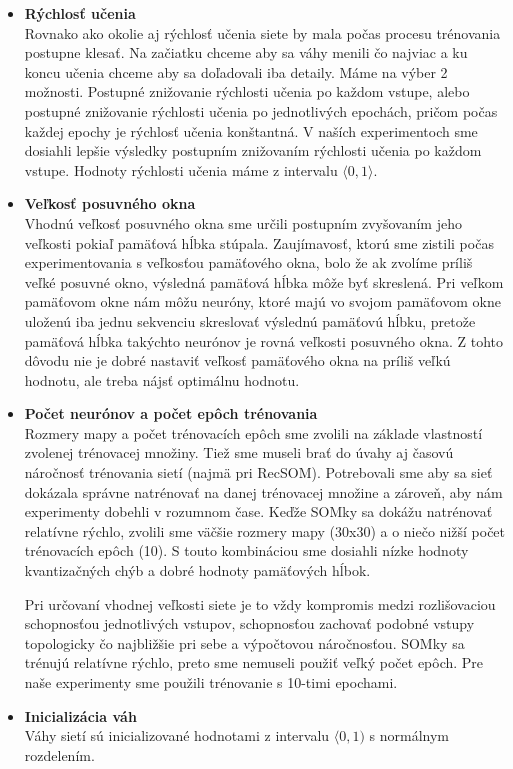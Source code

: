 \begin{itemize}
    \item \textbf{Rýchlosť učenia} \\
    Rovnako ako okolie aj rýchlosť učenia siete by mala počas
procesu trénovania postupne klesať. Na začiatku chceme aby sa váhy menili čo najviac
a ku koncu učenia chceme aby sa doľadovali iba detaily.
Máme na výber 2 možnosti. Postupné znižovanie rýchlosti učenia po každom vstupe, alebo 
postupné znižovanie rýchlosti učenia po jednotlivých epochách, pričom počas každej epochy
je rýchlosť učenia konštantná. 
V naších experimentoch sme dosiahli lepšie výsledky postupním 
znižovaním rýchlosti učenia po každom vstupe. 
Hodnoty rýchlosti učenia máme z intervalu $\langle0, 1\rangle$.
    \item \textbf{Veľkosť posuvného okna} \\
    Vhodnú veľkosť posuvného okna sme určili postupním zvyšovaním jeho veľkosti pokiaľ pamäťová hĺbka stúpala. 
Zaujímavosť, ktorú sme zistili počas experimentovania s veľkosťou pamäťového okna, bolo že 
ak zvolíme príliš veľké posuvné okno, výsledná pamäťová hĺbka môže byť skreslená.
Pri veľkom pamäťovom okne nám môžu neuróny, ktoré majú vo svojom pamäťovom okne uloženú iba 
jednu sekvenciu skreslovať výslednú pamäťovú hĺbku, pretože pamäťová hĺbka takýchto
neurónov je rovná veľkosti posuvného okna. Z tohto dôvodu nie je dobré nastaviť veľkosť pamäťového okna na 
príliš veľkú hodnotu, ale treba nájsť optimálnu hodnotu.
    \item \textbf{Počet neurónov a počet epôch trénovania} \\
    Rozmery mapy a počet trénovacích epôch sme zvolili na základe vlastností zvolenej trénovacej množiny. 
Tiež sme museli brať do úvahy aj časovú náročnosť trénovania sietí (najmä pri RecSOM).
Potrebovali sme aby sa sieť dokázala správne natrénovať na danej trénovacej množine a zároveň, aby nám experimenty dobehli v rozumnom čase.
Keďže SOMky sa dokážu natrénovať relatívne rýchlo, zvolili sme väčšie rozmery mapy (30x30) a o niečo nižší počet trénovacích epôch (10).
S touto kombináciou sme dosiahli nízke hodnoty kvantizačných chýb a dobré hodnoty pamäťových hĺbok.

Pri určovaní vhodnej veľkosti siete je to vždy kompromis medzi rozlišovaciou schopnosťou jednotlivých vstupov, schopnosťou
zachovať podobné vstupy topologicky čo najbližšie pri sebe a výpočtovou náročnosťou. 
SOMky sa trénujú relatívne rýchlo, preto sme nemuseli použiť veľký počet epôch. Pre naše experimenty sme 
použili trénovanie s 10-timi epochami.
    \item \textbf{Inicializácia váh} \\ 
Váhy sietí sú inicializované hodnotami z intervalu $\langle0, 1)$ s normálnym rozdelením.
\end{itemize}


